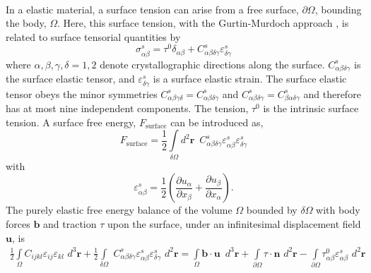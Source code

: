 \documentclass[22pt]{article} %
\begin{document}
\paragraph{}In a elastic material, a surface tension can arise from a free surface, $\partial \Omega$, bounding the body, $\Omega$.
%
Here, this surface tension, with the Gurtin-Murdoch approach \cite{Morton1975},  is related to surface tensorial quantities by
%
\begin{equation}\tag{3.1}
\sigma_{\alpha \beta}^s = \tau^0 \delta_{\alpha \beta} + C_{\alpha \beta \delta \gamma}^s \varepsilon_{\delta \gamma}^s
\end{equation}
%
where $\alpha, \beta, \gamma, \delta = 1,2$ denote crystallographic directions along the surface.
%
$C_{\alpha \beta \delta \gamma}^s$ is the surface elastic tensor, and $\varepsilon_{\delta \gamma}^s$ is a surface elastic strain. The surface elastic tensor obeys the minor symmetries $C_{\alpha \beta \gamma \delta}^s = C_{\alpha \beta \delta \gamma }^s$ and $C_{\alpha \beta \delta \gamma}^s = C_{\beta \alpha \delta \gamma }^s$ and therefore has at most nine independent components.
%
The tension, $\tau^0$ is the intrinsic surface tension.
%
A surface free energy, $F_\mathrm{surface}$ can be introduced as,
%
\begin{equation}\tag{3}
F_\mathrm{surface} = \frac{1}{2} \int\limits_{\delta \Omega} d^2 \textbf{r} \,\,\, C_{\alpha \beta \delta \gamma }^s \varepsilon_{\alpha \beta}^s \varepsilon_{\delta \gamma}^s 
\end{equation}
%
with
%
\begin{equation}\tag{4}
 \varepsilon_{\alpha \beta}^s = \frac{1}{2} \left(\frac{\partial u_\alpha}{\partial x_\beta} + \frac{\partial u_\beta}{\partial x_\alpha} \right).
\end{equation}
%
The purely elastic free energy balance of the volume $\Omega$ bounded by $\delta \Omega$ with body forces $\textbf{b}$ and traction $\tau$ upon the surface, under an infinitesimal displacement field $\textbf{u}$, is
%
\begin{align}\tag{5}
 \frac{1}{2} \int\limits_\Omega C_{ijkl} \varepsilon_{ij} \varepsilon_{kl} \,\,d^3 \textbf{r} + \frac{1}{2} \int\limits_{\delta \Omega} \,\, C_{\alpha \beta \delta \gamma}^s \varepsilon_{\alpha \beta}^s \varepsilon_{\delta \gamma}^s\,\, d^2 \textbf{r} = \int\limits_\Omega \textbf{b} \cdot \textbf{u} \,\,\,d^3 \textbf{r} + \int\limits_{\partial \Omega} \tau \cdot \mathbf{\hat{n}} \,\,d^2 \textbf{r} - \int\limits_{\partial \Omega} \tau^0_{\alpha \beta} \varepsilon_{\alpha \beta}^s \,\,d^2 \textbf{r} \\ \nonumber
\end{align}
\end{document}
